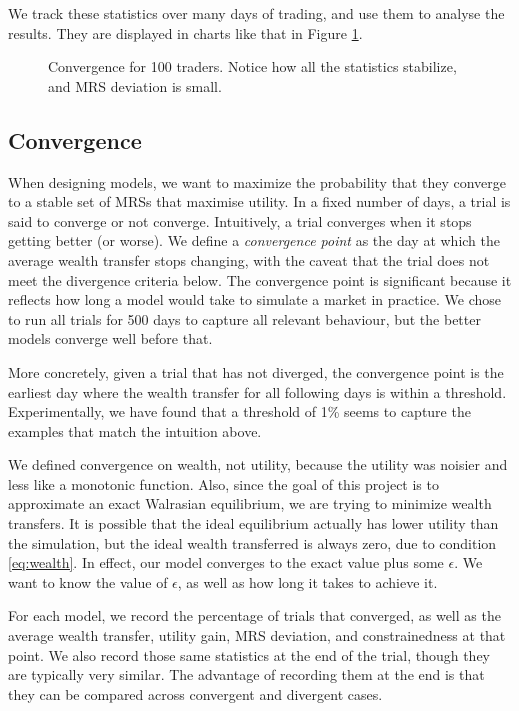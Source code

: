 \documentclass[12pt,a4paper,titlepage]{article}
\begin{document}
We track these statistics over many days of trading, and use them to analyse the results.
They are displayed in charts like that in Figure \ref{fig:conv}.

\begin{figure}[H]
    \centering
    
    \caption{
      Convergence for 100 traders.
      Notice how all the statistics stabilize, and MRS deviation is small.
    }
    \label{fig:conv}
\end{figure}

\subsection{Convergence}
When designing models, we want to maximize the probability that they converge to a stable set of MRSs that maximise utility.
In a fixed number of days, a trial is said to converge or not converge.
Intuitively, a trial converges when it stops getting better (or worse).
We define a \textit{convergence point} as the day at which the average wealth transfer stops changing, with the caveat that the trial does not meet the divergence criteria below.
The convergence point is significant because it reflects how long a model would take to simulate a market in practice.
We chose to run all trials for 500 days to capture all relevant behaviour, but the better models converge well before that.

More concretely, given a trial that has not diverged, the convergence point is the earliest day where the wealth transfer for all following days is within a threshold.
Experimentally, we have found that a threshold of 1\% seems to capture the examples that match the intuition above.

We defined convergence on wealth, not utility, because the utility was noisier and less like a monotonic function.
Also, since the goal of this project is to approximate an exact Walrasian equilibrium, we are trying to minimize wealth transfers.
It is possible that the ideal equilibrium actually has lower utility than the simulation, but the ideal wealth transferred is always zero, due to condition \ref{eq:wealth}.
In effect, our model converges to the exact value plus some $\epsilon$.
We want to know the value of $\epsilon$, as well as how long it takes to achieve it.

For each model, we record the percentage of trials that converged, as well as the average wealth transfer, utility gain, MRS deviation, and constrainedness at that point.
We also record those same statistics at the end of the trial, though they are typically very similar.
The advantage of recording them at the end is that they can be compared across convergent and divergent cases.
\end{document}
